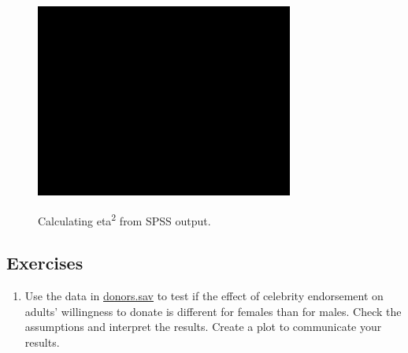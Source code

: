 \documentclass[a4paper]{book}
\providecommand{\tightlist}{%
  \setlength{\itemsep}{0pt}\setlength{\parskip}{0pt}}
\theoremstyle{definition}
\theoremstyle{definition}
\theoremstyle{definition}
\theoremstyle{remark}
\begin{document}
\begin{figure}[H]
\href{https://www.youtube.com/embed/yOZW9tQgzFk}{\includegraphics[width=320px]{GentleIntro_files/figure-latex/SPSSeta2-1} }\caption{Calculating eta\textsuperscript{2} from SPSS output.}\label{fig:SPSSeta2}
\end{figure}

\subsection{Exercises}\label{exercises-6}

\begin{enumerate}
\def\labelenumi{\arabic{enumi}.}
\tightlist
\item
  Use the data in
  \href{http://82.196.4.233:3838/data/donors.sav}{donors.sav} to test if
  the effect of celebrity endorsement on adults' willingness to donate
  is different for females than for males. Check the assumptions and
  interpret the results. Create a plot to communicate your results.
\end{enumerate}
\end{document}
